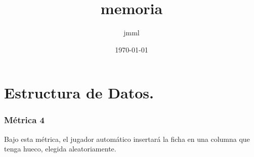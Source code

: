 \documentclass[11pt]{article}
\author{jmml}
\date{\today}
\title{memoria}
\begin{document}
\maketitle
\tableofcontents

\section{Estructura de Datos.}
\label{sec-1}

\subsubsection{Métrica 4}
\label{sec-1-0-1}

Bajo esta métrica, el jugador automático insertará la ficha en una columna que tenga hueco, elegida aleatoriamente.
\end{document}

